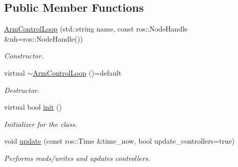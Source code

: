 \subsection*{Public Member Functions}
\begin{DoxyCompactItemize}
\item 
\hyperlink{classuwrt_1_1arm_1_1_arm_control_loop_a205726d352abb0e7696c10e337db0347}{Arm\+Control\+Loop} (std\+::string name, const ros\+::\+Node\+Handle \&nh=ros\+::\+Node\+Handle())
\begin{DoxyCompactList}\small\item\em Constructor. \end{DoxyCompactList}\item 
virtual \hyperlink{classuwrt_1_1arm_1_1_arm_control_loop_a35e34c53f7a7d42bc430e1b8a26328ee}{$\sim$\+Arm\+Control\+Loop} ()=default
\begin{DoxyCompactList}\small\item\em Destructor. \end{DoxyCompactList}\item 
virtual bool \hyperlink{classuwrt_1_1arm_1_1_arm_control_loop_a40fbe9c3e41bd01174c61aca2faec58b}{init} ()
\begin{DoxyCompactList}\small\item\em Initializer for the class. \end{DoxyCompactList}\item 
void \hyperlink{classuwrt_1_1arm_1_1_arm_control_loop_a3f779ad43e5c210bf977469d25f15036}{update} (const ros\+::\+Time \&time\+\_\+now, bool update\+\_\+controllers=true)
\begin{DoxyCompactList}\small\item\em Performs reads/writes and updates controllers. \end{DoxyCompactList}\end{DoxyCompactItemize}
